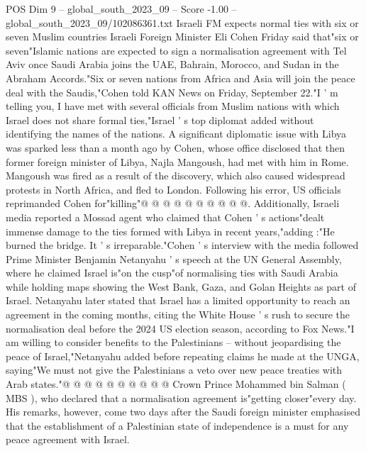 \begin{textsample}{POS Dim 9 – global\_south\_2023\_09 – Score -1.00 – global\_south\_2023\_09/102086361.txt}  \label{ex:f9_pos_433}
Israeli FM expects normal ties with six or seven Muslim countries Israeli Foreign Minister Eli Cohen Friday said that"six or seven"Islamic nations are expected to sign a normalisation agreement with Tel Aviv once Saudi Arabia joins the UAE, Bahrain, Morocco, and Sudan in the Abraham Accords."Six or seven nations from Africa and Asia will join the peace deal with the Saudis,"Cohen told KAN News on Friday, September 22."I ' m telling you, I have met with several officials from Muslim nations with which Israel does not share formal ties,"Israel ' s top diplomat added without identifying the names of the nations.
A significant diplomatic issue with Libya was sparked less than a month ago by Cohen, whose office disclosed that then former foreign minister of Libya, Najla Mangoush, had met with him in Rome.
Mangoush was fired as a result of the discovery, which also caused widespread protests in North Africa, and fled to London.
Following his error, US officials reprimanded Cohen for"killing"@ @ @ @ @ @ @ @ @ @.
Additionally, Israeli media reported a Mossad agent who claimed that Cohen ' s actions"dealt immense damage to the ties formed with Libya in recent years,"adding :"He burned the bridge.
It ' s irreparable."Cohen ' s interview with the media followed Prime Minister Benjamin Netanyahu ' s speech at the UN General Assembly, where he claimed Israel is"on the cusp"of normalising ties with Saudi Arabia while holding maps showing the West Bank, Gaza, and Golan Heights as part of Israel.
Netanyahu later stated that Israel has a limited opportunity to reach an agreement in the coming months, citing the White House ' s rush to secure the normalisation deal before the 2024 US election season, according to Fox News."I am willing to consider benefits to the Palestinians -- without jeopardising the peace of Israel,"Netanyahu added before repeating claims he made at the UNGA, saying"We must not give the Palestinians a veto over new peace treaties with Arab states."@ @ @ @ @ @ @ @ @ @ Crown Prince Mohammed bin Salman ( MBS ), who declared that a normalisation agreement is"getting closer"every day.
His remarks, however, come two days after the Saudi foreign minister emphasised that the establishment of a Palestinian state of independence is a must for any peace agreement with Israel.

\end{textsample}
